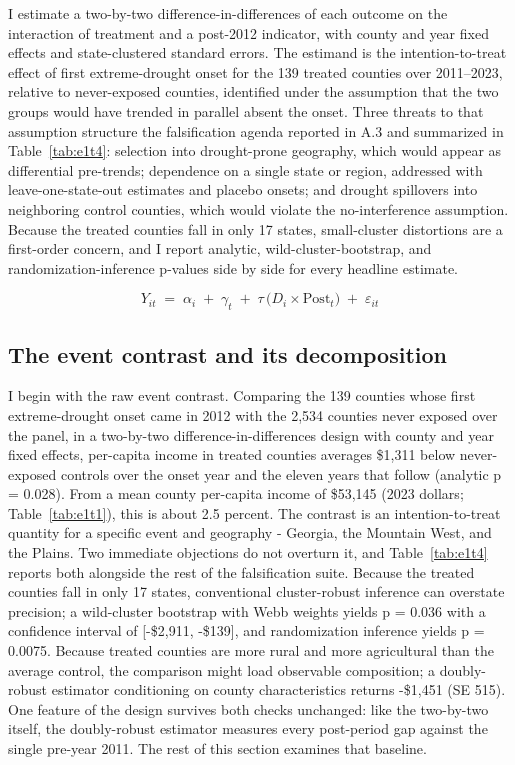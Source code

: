 \documentclass[a4paper,11pt]{report}
\begin{document}
I estimate a two-by-two difference-in-differences of each outcome on the interaction of treatment and a post-2012 indicator, with county and year fixed effects and state-clustered standard errors. The estimand is the intention-to-treat effect of first extreme-drought onset for the 139 treated counties over 2011--2023, relative to never-exposed counties, identified under the assumption that the two groups would have trended in parallel absent the onset. Three threats to that assumption structure the falsification agenda reported in A.3 and summarized in Table~\ref{tab:e1t4}: selection into drought-prone geography, which would appear as differential pre-trends; dependence on a single state or region, addressed with leave-one-state-out estimates and placebo onsets; and drought spillovers into neighboring control counties, which would violate the no-interference assumption. Because the treated counties fall in only 17 states, small-cluster distortions are a first-order concern, and I report analytic, wild-cluster-bootstrap, and randomization-inference p-values side by side for every headline estimate.

\begin{equation}
Y_{it} \;=\; \alpha_i \;+\; \gamma_t \;+\; \tau \,\bigl(D_i \times \mathrm{Post}_t\bigr)
\;+\; \varepsilon_{it}
\label{eq:did2x2}
\end{equation}

\FloatBarrier
\subsection{The event contrast and its decomposition}

I begin with the raw event contrast. Comparing the 139 counties whose first extreme-drought onset came in 2012 with the 2,534 counties never exposed over the panel, in a two-by-two difference-in-differences design with county and year fixed effects, per-capita income in treated counties averages \$1,311 below never-exposed controls over the onset year and the eleven years that follow (analytic p = 0.028). From a mean county per-capita income of \$53,145 (2023 dollars; Table~\ref{tab:e1t1}), this is about 2.5 percent. The contrast is an intention-to-treat quantity for a specific event and geography - Georgia, the Mountain West, and the Plains. Two immediate objections do not overturn it, and Table~\ref{tab:e1t4} reports both alongside the rest of the falsification suite. Because the treated counties fall in only 17 states, conventional cluster-robust inference can overstate precision; a wild-cluster bootstrap with Webb weights yields p = 0.036 with a confidence interval of [-\$2,911, -\$139], and randomization inference yields p = 0.0075. \citep{cameron2008bootstrap,mackinnonwebb2018wildbootstrap,young2019channelingfisher} Because treated counties are more rural and more agricultural than the average control, the comparison might load observable composition; a doubly-robust estimator conditioning on county characteristics returns -\$1,451 (SE 515). One feature of the design survives both checks unchanged: like the two-by-two itself, the doubly-robust estimator measures every post-period gap against the single pre-year 2011. The rest of this section examines that baseline.
\end{document}

